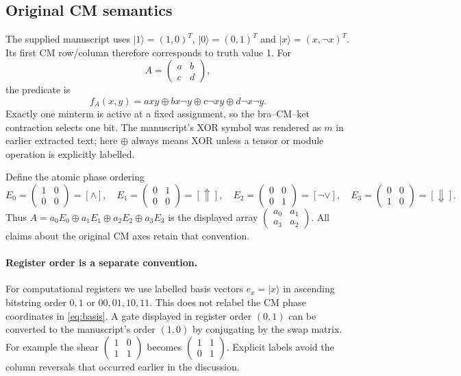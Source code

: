 \documentclass[11pt,a4paper]{article}
\theoremstyle{definition}\newtheorem{definition}[theorem]{Definition}
\theoremstyle{remark}\newtheorem{remark}[theorem]{Remark}
\newcommand{\ket}[1]{\lvert #1\rangle}
\newcommand{\cm}[4]{\begin{pmatrix}#1&#2\\#3&#4\end{pmatrix}}
\numberwithin{equation}{section}
\begin{document}
\subsection{Original CM semantics}
The supplied manuscript uses $\ket{1}=(1,0)^T$, $\ket{0}=(0,1)^T$ and $\ket{x}=(x,\neg x)^T$. Its first CM row/column therefore corresponds to truth value 1. For
\begin{equation}
 A=\cm abcd,
\end{equation}
the predicate is
\begin{equation}\label{eq:predicate}
 f_A(x,y)=a xy\oplus b x\neg y\oplus c\neg x y\oplus d\neg x\neg y.
\end{equation}
Exactly one minterm is active at a fixed assignment, so the bra--CM--ket contraction selects one bit. The manuscript's XOR symbol was rendered as $m$ in earlier extracted text; here $\oplus$ always means XOR unless a tensor or module operation is explicitly labelled.

Define the atomic phase ordering
\begin{equation}\label{eq:basis}
 E_0=\cm1000=[\wedge],\quad
 E_1=\cm0100=[\Uparrow],\quad
 E_2=\cm0001=[\neg\vee],\quad
 E_3=\cm0010=[\Downarrow].
\end{equation}
Thus $A=a_0E_0\oplus a_1E_1\oplus a_2E_2\oplus a_3E_3$ is the displayed array
$\left(\begin{smallmatrix}a_0&a_1\\a_3&a_2\end{smallmatrix}\right)$.
All claims about the original CM axes retain that convention.

\paragraph{Register order is a separate convention.}
For computational registers we use labelled basis vectors $e_x=\ket{x}$ in ascending bitstring order $0,1$ or $00,01,10,11$. This does not relabel the CM phase coordinates in \cref{eq:basis}. A gate displayed in register order $(0,1)$ can be converted to the manuscript's order $(1,0)$ by conjugating by the swap matrix. For example the shear $\left(\begin{smallmatrix}1&0\\1&1\end{smallmatrix}\right)$ becomes $\left(\begin{smallmatrix}1&1\\0&1\end{smallmatrix}\right)$. Explicit labels avoid the column reversals that occurred earlier in the discussion.
\end{document}
